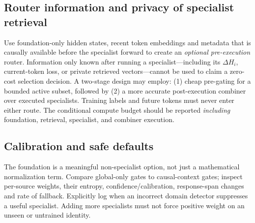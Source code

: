 \documentclass[11pt,letterpaper]{article}
\begin{document}
\subsection{Router information and privacy of specialist retrieval}
Use foundation-only hidden states, recent token embeddings and metadata that is causally available before the specialist forward to create an \emph{optional pre-execution} router. Information only known after running a specialist---including its $\Delta H_i$, current-token loss, or private retrieved vectors---cannot be used to claim a zero-cost selection decision. A two-stage design may employ: (1) cheap pre-gating for a bounded active subset, followed by (2) a more accurate post-execution combiner over executed specialists. Training labels and future tokens must never enter either route. The conditional compute budget should be reported \emph{including} foundation, retrieval, specialist, and combiner execution.

\subsection{Calibration and safe defaults}
The foundation is a meaningful non-specialist option, not just a mathematical normalization term. Compare global-only gates to causal-context gates; inspect per-source weights, their entropy, confidence/calibration, response-span changes and rate of fallback. Explicitly log when an incorrect domain detector suppresses a useful specialist. Adding more specialists must not force positive weight on an unseen or untrained identity.
\end{document}

